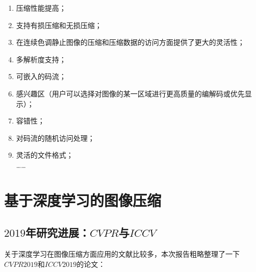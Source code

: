 \documentclass[UTF8]{ctexart}
\begin{document}
    			\begin{enumerate}[leftmargin=50pt]
    				\item 压缩性能提高；
                    \item 支持有损压缩和无损压缩；
                    \item 在连续色调静止图像的压缩和压缩数据的访问方面提供了更大的灵活性；
                    \item 多解析度支持；
                    \item 可嵌入的码流；
                    \item 感兴趣区（用户可以选择对图像的某一区域进行更高质量的编解码或优先显示）；
                    \item 容错性；
                    \item 对码流的随机访问处理；
                    \item 灵活的文件格式； \\
                    ……            
    			\end{enumerate}            

    \section{基于深度学习的图像压缩}
        
        \subsection{$2019$年研究进展：$CVPR$与$ICCV$}
        
        \indent 关于深度学习在图像压缩方面应用的文献比较多，本次报告粗略整理了一下$CVPR2019$和$ICCV2019$的论文：
        
\end{document}
